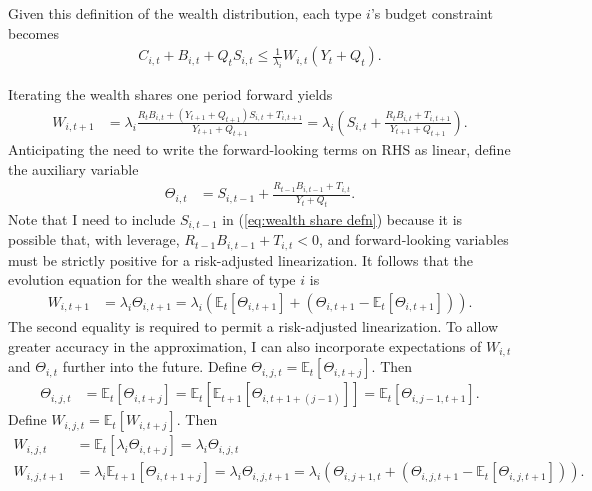 \documentclass[12 pt, oneside]{article}
\theoremstyle{definition}
\theoremstyle{definition}
\theoremstyle{definition}
\newcommand{\E}{\mathbb{E}}
\begin{document}
Given this definition of the wealth distribution, each type $i$'s budget constraint becomes
\begin{align}\label{eq:hh budget constraint with wealth share}
  C_{i, t} + B_{i, t} + Q_t S_{i, t}\leq \frac{1}{\lambda_i} W_{i, t} (Y_t +  Q_t).
\end{align}

Iterating the wealth shares one period forward yields
\begin{align*}
  W_{i, t + 1} & = \lambda_i\frac{R_tB_{i, t} + (Y_{t + 1} + Q_{t + 1}) S_{i, t} + T_{i, t + 1}}{Y_{t + 1} + Q_{t + 1}} = \lambda_i\left(S_{i, t} + \frac{R_tB_{i, t} + T_{i, t + 1}}{Y_{t + 1} +  Q_{t + 1}}\right).
\end{align*}
Anticipating the need to write the forward-looking terms on RHS as linear, define the auxiliary variable
\begin{align}\label{eq:wealth share auxiliary defn}
  \Theta_{i, t} & = S_{i, t - 1} + \frac{R_{t - 1}B_{i, t - 1} + T_{i, t}}{Y_t +  Q_t}.
\end{align}
Note that I need to include $S_{i, t - 1}$ in (\ref{eq:wealth share defn}) because it is possible that, with leverage, $R_{t - 1} B_{i, t - 1} + T_{i, t} < 0$, and forward-looking variables must be strictly positive for a risk-adjusted linearization. It follows that the evolution equation for the wealth share of type $i$ is
\begin{align*}
  W_{i, t + 1} & = \lambda_i \Theta_{i, t + 1} = \lambda_i(\E_t[\Theta_{i, t + 1}] + (\Theta_{i, t + 1} - \E_t[\Theta_{i, t + 1}])).
\end{align*}
The second equality is required to permit a risk-adjusted linearization. To allow greater accuracy in the approximation, I can also incorporate
expectations of $W_{i, t}$ and $\Theta_{i, t}$ further into the future. Define $\Theta_{i, j, t} = \E_t[\Theta_{i, t + j}]$. Then
\begin{align*}
  \Theta_{i, j, t} & = \E_t[\Theta_{i, t + j}] = \E_t[\E_{t + 1}[\Theta_{i, t + 1 + (j - 1)}]] = \E_t[\Theta_{i, j - 1, t + 1}].
\end{align*}
Define $W_{i, j, t} = \E_t[W_{i, t + j}]$. Then
\begin{align*}
  W_{i, j, t} & = \E_t[\lambda_i\Theta_{i, t + j}] = \lambda_i\Theta_{i, j, t}\\
  W_{i, j, t + 1} & = \lambda_i\E_{t + 1}[\Theta_{i, t + 1 + j}] = \lambda_i\Theta_{i, j, t + 1} = \lambda_i(\Theta_{i, j + 1, t} + (\Theta_{i, j, t + 1} - \E_t[\Theta_{i, j, t + 1}])).
\end{align*}
\end{document}

